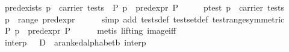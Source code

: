 \begin{isabellebody}
\endisatagproof
{\isafoldproof}%
%
\isadelimproof
\isanewline
%
\endisadelimproof
\isanewline
{}\isamarkupfalse%
\ pred{}exists{}\ {}p\ {}\ carrier\ tests\ {}\ {}P{}\ p\ {}\ pred{}expr\ P{}\isanewline
%
\isadelimproof
%
\endisadelimproof
%
\isatagproof
{}\isamarkupfalse%
\ {}\isanewline
\ \ \isamarkupfalse%
\ p{}test{}\ {}p\ {}\ carrier\ tests{}\isanewline
\ \ \isamarkupfalse%
\ {}p\ {}\ range\ pred{}expr{}\isanewline
\ \ \ \ \isamarkupfalse%
\ {}simp\ add{}\ tests{}def\ test{}set{}def\ test{}range{}symmetric{}{}\isanewline
\ \ \isamarkupfalse%
\ {}{}P{}\ p\ {}\ pred{}expr\ P{}\isanewline
\ \ \ \ \isamarkupfalse%
\ {}metis\ {}lifting{}\ image{}iff{}\isanewline
{}\isamarkupfalse%
%
\endisatagproof
{\isafoldproof}%
%
\isadelimproof
\isanewline
%
\endisadelimproof
\isanewline
{}\isamarkupfalse%
\ interp\ {}\ \ D\ {}{}\ {}{}{}a{}{}ranked{}alphabet{}{}b{}\ interp{}\isanewline

\end{isabellebody}
